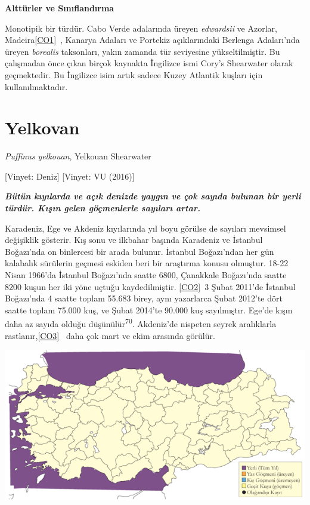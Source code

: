 \documentclass[
  letterpaper,
  DIV=11,
  numbers=noendperiod]{scrreprt}
\begin{document}
\textbf{Alttürler ve Sınıflandırma}

Monotipik bir türdür. Cabo Verde adalarında üreyen \emph{edwardsii} ve
Azorlar, Madeira\hyperref[_msocom_1]{{[}CO1{]}}~, Kanarya Adaları ve
Portekiz açıklarındaki Berlenga Adaları'nda üreyen \emph{borealis}
taksonları, yakın zamanda tür seviyesine yükseltilmiştir. Bu çalışmadan
önce çıkan birçok kaynakta İngilizce ismi Cory's Shearwater olarak
geçmektedir. Bu İngilizce isim artık sadece Kuzey Atlantik kuşları için
kullanılmaktadır.

\section{Yelkovan}\label{yelkovan}

\emph{Puffinus yelkouan}, Yelkouan Shearwater

{[}Vinyet: Deniz{]} {[}Vinyet: VU (2016){]}

\textbf{\emph{Bütün kıyılarda ve açık denizde yaygın ve çok sayıda
bulunan bir yerli türdür. Kışın gelen göçmenlerle sayıları artar.}}

Karadeniz, Ege ve Akdeniz kıyılarında yıl boyu görülse de sayıları
mevsimsel değişiklik gösterir. Kış sonu ve ilkbahar başında Karadeniz ve
İstanbul Boğazı'nda on binlercesi bir arada bulunur. İstanbul
Boğazı'ndan her gün kalabalık sürülerin geçmesi eskiden beri bir
araştırma konusu olmuştur. 18-22 Nisan 1966'da İstanbul Boğazı'nda
saatte 6800, Çanakkale Boğazı'nda saatte 8200 kuşun her iki yöne uçtuğu
kaydedilmiştir. \hyperref[_msocom_2]{{[}CO2{]}}~3 Şubat 2011'de İstanbul
Boğazı'nda 4 saatte toplam 55.683 birey, aynı yazarlarca Şubat 2012'te
dört saatte toplam 75.000 kuş, ve Şubat 2014'te 90.000 kuş sayılmıştır.
Ege'de kışın daha az sayıda olduğu düşünülür\textsuperscript{70}.
Akdeniz'de nispeten seyrek aralıklarla
rastlanır,\hyperref[_msocom_3]{{[}CO3{]}}~ daha çok mart ve ekim
arasında görülür.

\includegraphics{images/harita_Page_049.png}
\end{document}
